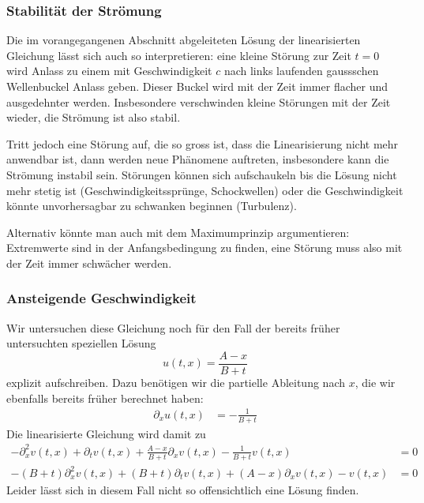\subsubsection{Stabilität der Strömung}
Die im vorangegangenen Abschnitt abgeleiteten Lösung der linearisierten
Gleichung lässt sich auch so interpretieren: eine kleine Störung zur Zeit
$t=0$ wird Anlass zu einem mit Geschwindigkeit $c$ nach links
laufenden gaussschen Wellenbuckel Anlass geben. Dieser Buckel wird mit
der Zeit immer flacher und ausgedehnter werden. Insbesondere verschwinden
kleine Störungen mit der Zeit wieder, die Strömung ist also stabil.

Tritt jedoch eine Störung auf, die so gross ist, dass die Linearisierung
nicht mehr anwendbar ist, dann werden neue Phänomene auftreten, insbesondere kann
die Strömung instabil sein. Störungen können sich aufschaukeln bis die
Lösung nicht mehr stetig ist (Geschwindigkeitssprünge, Schockwellen)
oder die Geschwindigkeit könnte unvorhersagbar zu schwanken beginnen
(Turbulenz).

Alternativ könnte man auch mit dem Maximumprinzip argumentieren: Extremwerte
sind in der Anfangsbedingung zu finden, eine Störung muss also mit der
Zeit immer schwächer werden.

\subsubsection{Ansteigende Geschwindigkeit}
Wir untersuchen diese Gleichung noch für den Fall der bereits 
früher untersuchten speziellen Lösung 
\[
u(t,x)=\frac{A-x}{B+t}
\]
explizit aufschreiben. Dazu benötigen wir die partielle Ableitung
nach $x$, die wir ebenfalls bereits früher berechnet haben:
\begin{align*}
\partial_x u(t,x)&=-\frac{1}{B+t}
\end{align*}
Die linearisierte Gleichung wird damit zu
\begin{align*}
-\partial_x^2v(t,x)
+\partial_tv(t,x)
+ \frac{A-x}{B+t}\partial_xv(t,x)
-\frac{1}{B+t} v(t,x)
&=0
\\
-(B+t)\partial_x^2v(t,x)
+(B+t)\partial_tv(t,x)
+ (A-x)\partial_xv(t,x)
- v(t,x)
&=0
\end{align*}
Leider lässt sich in diesem Fall nicht so offensichtlich eine Lösung finden.

